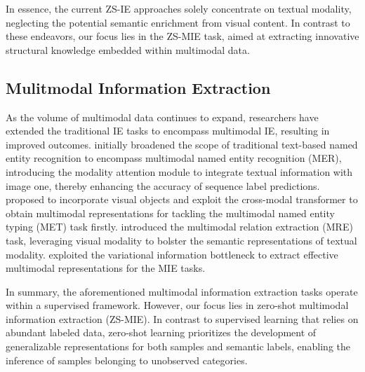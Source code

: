 In essence, the current ZS-IE approaches solely concentrate on textual modality,
neglecting the potential semantic enrichment from visual content. In contrast to
these endeavors, our focus lies in the ZS-MIE task, aimed at extracting
innovative structural knowledge embedded within multimodal data.

\subsection{Mulitmodal Information Extraction}
%
As the volume of multimodal data continues to expand, researchers have extended
the traditional IE tasks to encompass multimodal IE, resulting in improved
outcomes.
%
\citet{DBLP:conf/naacl/MoonNC18} initially broadened the scope of traditional
text-based named entity recognition to encompass multimodal named entity
recognition (MER), introducing the modality attention module to integrate
textual information with image one, thereby enhancing the accuracy of sequence
label predictions.
%
\citet{zhang-etal-2023-incorporating-object} proposed to incorporate visual
objects and exploit the cross-modal transformer to obtain multimodal
representations for tackling the multimodal named entity typing (MET) task
firstly.
%
\citet{DBLP:conf/mm/ZhengFFCL021} introduced the multimodal relation extraction
(MRE) task, leveraging visual modality to bolster the semantic representations
of textual modality.
%
\citet{DBLP:journals/taslp/CuiCCSLLS24} exploited the variational information
bottleneck to extract effective multimodal representations for the MIE tasks.

In summary, the aforementioned multimodal information extraction tasks operate
within a supervised framework. However, our focus lies in zero-shot multimodal
information extraction (ZS-MIE). In contrast to supervised learning that relies
on abundant labeled data, zero-shot learning prioritizes the development of
generalizable representations for both samples and semantic labels, enabling the
inference of samples belonging to unobserved categories.